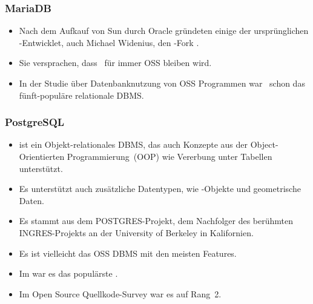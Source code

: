 \documentclass[aspectratio=169,mathserif,notheorems]{beamer}%
\begin{document}
%
\begin{frame}%
\frametitle{MariaDB}%
\begin{itemize}%
\item Nach dem Aufkauf von Sun durch Oracle gründeten einige der ursprünglichen \mysql-Entwicklet, auch Michael Widenius, den \mysql-Fork \mariadb\cite{R2014MM,B2019LTMEELFFSAA,D2015LMAM,AA2018QAWMV1ITSQ,AA2018QAWMV2IDQ}.%
\item<2-> Sie versprachen, dass \mariadb\ für immer OSS bleiben wird.%
\item<3-> In der Studie\cite{PMPVEPWGSMB2025ATAODMSTTHOOSP} über Datenbanknutzung von  OSS Programmen war \mariadb\ schon das fünft-populäre relationale DBMS.%
\end{itemize}%
%
%
\end{frame}%
%
\begin{frame}[t]%
\frametitle{PostgreSQL}%
\begin{itemize}%
\item \postgresql\cite{TA2024DDAMWPAM,FP2023LP,OH2017PUAR,B2024PELUYDW} ist ein Objekt-relationales DBMS, das auch Konzepte aus der Object-Orientierten Programmierung~(OOP) wie Vererbung unter Tabellen unterstützt.
\item<2-> Es unterstützt auch zusätzliche Datentypen, wie -Objekte und geometrische Daten.
\item<3-> Es stammt aus dem POSTGRES-Projekt, dem Nachfolger des berühmten INGRES-Projekts an der University of Berkeley in Kalifornien\cite{C20245YOQ}.%
\item<4-> Es ist vielleicht das OSS DBMS mit den meisten Features.%
\item<5-> Im  war es das populärste \cite{SE:SO:2024DS}.
\item<6-> Im Open Source Quellkode-Survey\cite{PMPVEPWGSMB2025ATAODMSTTHOOSP} war es auf Rang~2.
\end{itemize}%
%
%
\end{frame}%
%
\end{document}
